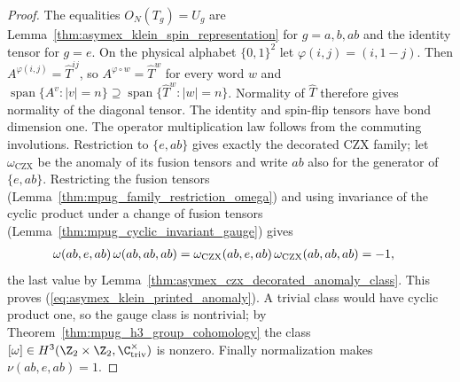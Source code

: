 \begin{proof}
    \leanok
    The equalities $O_N(T_g)=U_g$ are
    Lemma~\ref{thm:asymex_klein_spin_representation} for $g=a,b,ab$ and
    the identity tensor for $g=e$. On the physical alphabet
    $\{0,1\}^2$ let $\varphi(i,j)=(i,1-j)$. Then
    $A^{\varphi(i,j)}=\widehat T^{ij}$, so $A^{\varphi\circ w}=\widehat T^{w}$ for every
    word $w$ and
    $\operatorname{span}\{A^{v}:|v|=n\}\supseteq\operatorname{span}\{\widehat T^{w}:|w|=n\}$.
    Normality of $\widehat T$ therefore gives normality of the diagonal tensor. The identity and spin-flip
    tensors have bond dimension one. The operator multiplication law
    follows from the commuting involutions.
    Restriction to $\{e,ab\}$ gives exactly the decorated CZX family; let
    $\omega_{\mathrm{CZX}}$ be the anomaly of its fusion tensors and write
    $ab$ also for the generator of $\{e,ab\}$. Restricting the fusion
    tensors (Lemma~\ref{thm:mpug_family_restriction_omega}) and using
    invariance of the cyclic product under a change of fusion tensors
    (Lemma~\ref{thm:mpug_cyclic_invariant_gauge}) gives
    \begin{align}
        \omega(ab,e,ab)\,\omega(ab,ab,ab)
         & =\omega_{\mathrm{CZX}}(ab,e,ab)\,\omega_{\mathrm{CZX}}(ab,ab,ab)=-1,
        \notag
    \end{align}
    the last value by Lemma~\ref{thm:asymex_czx_decorated_anomaly_class}.
    This proves (\ref{eq:asymex_klein_printed_anomaly}). A trivial class would have
    cyclic product one, so the gauge class is nontrivial; by
    Theorem~\ref{thm:mpug_h3_group_cohomology} the class
    $[\omega]\in H^3(\Z_2\times\Z_2,\C^\times_{\mathrm{triv}})$ is nonzero. Finally normalization makes $\nu(ab,e,ab)=1$.
\end{proof}

